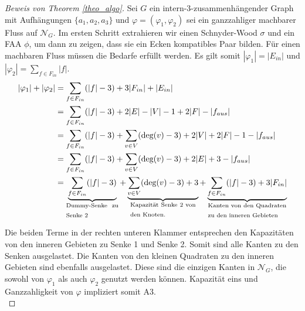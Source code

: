 \begin{proof}[Beweis von Theorem \ref{theo_algo}]
Sei $G$ ein intern-3-zusammenhängender Graph mit Aufhängungen $\{a_1,a_2,a_3\}$ und $\varphi=(\varphi_1,\varphi_2)$ sei ein ganzzahliger machbarer Fluss auf $\mathcal{N}_G$. Im ersten Schritt extrahieren wir einen Schnyder-Wood $\sigma$ und ein FAA $\phi$, um dann zu zeigen, dass sie ein Ecken kompatibles Paar bilden. Für einen machbaren Fluss müssen die Bedarfe erfüllt werden. Es gilt somit $|\varphi_1| =  |E_{in}|$ und $|\varphi_2| = \sum_{f \in F_{in}} |f|$.
\begin{equation}\label{eq_sat}
\begin{split}
|\varphi_1| + |\varphi_2| & = \sum_{f \in F_{in}} (|f|-3) + 3|F_{in}| + |E_{in}|\\
		& = \sum_{f \in F_{in}} (|f|-3) + 2|E| -|V| - 1 + 2|F| - |f_{aus}|\\
		& = \sum_{f \in F_{in}} (|f|-3) + \sum_{v \in V} (\text{deg}(v)-3) + 2|V| + 2|F| - 1 - |f_{aus}|\\
		& = \sum_{f \in F_{in}} (|f|-3) + \sum_{v \in V} (\text{deg}(v)-3) + 2|E| + 3 - |f_{aus}|\\
		& = \underbrace{\sum_{f \in F_{in}}(|f|-3)  }_{\text{\parbox{8em}{Dummy-Senke zu Senke 2}}} + \underbrace{\sum_{v \in V} (\text{deg}(v)-3) +3 }_{\text{\parbox{10em}{Kapazität Senke 2 von den Knoten.}}} +\underbrace{\sum_{f \in F_{in}}(|f|-3) + 3|F_{in}|}_{\text{\parbox{12em}{Kanten von den Quadraten zu den inneren Gebieten}}}
\end{split}
\end{equation}

Die beiden Terme in der rechten unteren Klammer entsprechen den Kapazitäten von den inneren Gebieten zu Senke 1 und Senke 2. Somit sind alle Kanten zu den Senken ausgelastet. Die Kanten von den kleinen Quadraten zu den inneren Gebieten sind ebenfalls ausgelastet. Diese sind die einzigen Kanten in $\mathcal{N}_G$, die sowohl von $\varphi_1$ als auch $\varphi_2$ genutzt werden können. Kapazität eins und Ganzzahligkeit von $\varphi$ impliziert somit A3.\\


\end{proof}
